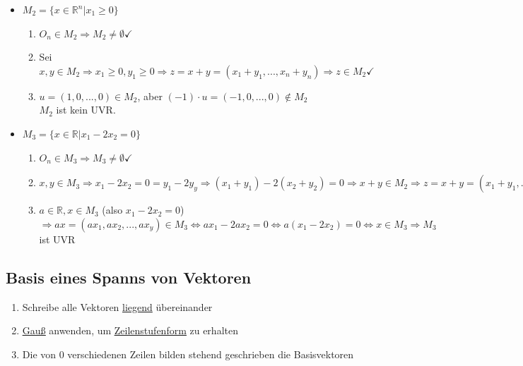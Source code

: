 \documentclass{scrartcl}
\newcommand{\linkTo}[1]{\hyperref[#1]{\underline{#1}}}
\newcommand{\linkToRef}[2][ref]{\hyperref[#1]{\underline{#2}}}
\begin{document}
\begin{Beispiel}
\begin{itemize}
\item %
		$M_2 = \{x \in \mathbb{R}^n | x_1 \geq 0\}$
		\begin{enumerate}[label={(\arabic*)}]
			\item %
			$O_n \in M_2 \Rightarrow M_2 \neq \emptyset \checkmark$
			
			\item %
			Sei $x,y \in M_2 \Rightarrow x_1 \geq 0, y_1 \geq 0 \Rightarrow z = x + y = (x_1 + y_1, ..., x_n + y_n) \Rightarrow z \in M_2 \checkmark$
			
			\item %
			$u = (1, 0, ..., 0) \in M_2$, aber $(-1) \cdot u = (-1, 0, ..., 0) \notin M_2$ \\
			$M_2$ ist kein UVR.
		\end{enumerate}
		
		\item %
		$M_3 = \{x \in \mathbb{R} | x_1 - 2x_2 = 0\}$
		\begin{enumerate}[label={(\arabic*)}]
			\item %
			$O_n \in M_3 \Rightarrow M_3 \neq \emptyset \checkmark$
			
			\item %
			$x,y \in M_3 \Rightarrow x_1 - 2x_2 = 0 = y_1 - 2y_y \Rightarrow (x_1 + y_1) - 2(x_2 + y_2) = 0 \Rightarrow x + y \in M_2 \Rightarrow z = x + y = (x_1 + y_1, ..., x_1 + y_y) \in M_3 \Leftrightarrow x_1 + y_1 - 2(x_2 + y_2) = 0 \Leftrightarrow x_1 - 2x_2 + y_1 - 2y_2 = 0 \Leftrightarrow x,y \in M_3$
			
			\item %
			$a \in \mathbb{R}, x \in M_3$ (also $x_1 - 2x_2 = 0$) $\Rightarrow ax = (ax_1, ax_2, ..., ax_y) \in M_3 \Leftrightarrow ax_1 - 2ax_2 = 0 \Leftrightarrow a(x_1 - 2x_2) = 0 \Leftrightarrow x \in M_3 \Rightarrow M_3$ ist UVR
		\end{enumerate}
\end{itemize}
\end{Beispiel}

\subsection{Basis eines Spanns von Vektoren}

\begin{enumerate}
\item Schreibe alle Vektoren \underline{liegend} übereinander
\item \linkToRef[Gauss]{Gauß} anwenden, um \linkTo{Zeilenstufenform} zu erhalten
\item Die von 0 verschiedenen Zeilen bilden stehend geschrieben die Basisvektoren
\end{enumerate}
\end{document}
